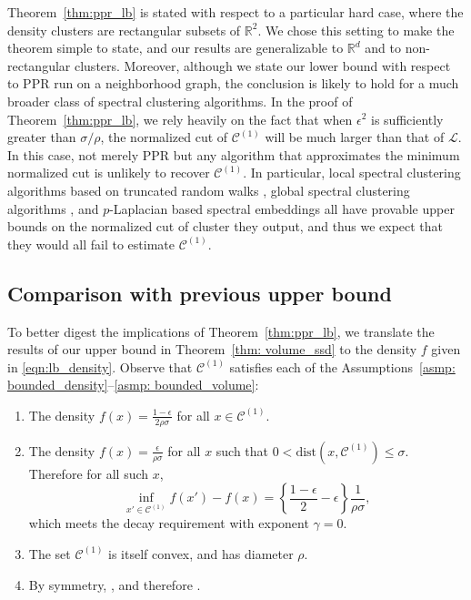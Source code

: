 \documentclass[11pt,twoside]{article}
\theoremstyle{definition}
\newcommand{\vol}{\mathrm{vol}}
\newcommand{\Reals}{\mathbb{R}}
\newcommand{\1}{\mathbbm{1}}
\newcommand{\dist}{\mathrm{dist}}
\newcommand{\Pbb}{\mathbb{P}}
\newcommand{\Cset}{\mathcal{C}}
\begin{document}
Theorem~\ref{thm:ppr_lb} is stated with respect to a particular hard case, where
the density clusters are rectangular subsets of $\Reals^2$.  We chose this
setting to make the theorem simple to state, and our results are generalizable
to $\Reals^d$ and to non-rectangular clusters.  Moreover, although we state
our lower bound with respect to PPR run on a neighborhood graph, the conclusion is
likely to hold for a much broader class of spectral clustering algorithms. In
the proof of Theorem~\ref{thm:ppr_lb}, we rely heavily on the fact that when
$\epsilon^2$ is sufficiently greater than $\sigma/\rho$, the normalized cut of
$\Cset^{(1)}$ will be much larger than that of $\mathcal{L}$. In this case, not
merely PPR but any algorithm that approximates the minimum normalized cut is
unlikely to recover $\Cset^{(1)}$. In particular, local spectral clustering
algorithms based on truncated random walks \citet{spielman2013}, global spectral
clustering algorithms \citet{shi00}, and $p$-Laplacian based spectral embeddings
\citet{hein2010} all have provable upper bounds on the normalized cut of cluster
they output, and thus we expect that they would all fail to estimate
$\Cset^{(1)}$.

\subsection{Comparison with previous upper bound}

To better digest the implications of Theorem~\ref{thm:ppr_lb}, we translate the
results of our upper bound in Theorem~\ref{thm: volume_ssd} to the density $f$
given in \eqref{eqn:lb_density}. Observe that $\Cset^{(1)}$ satisfies each of
the Assumptions~\ref{asmp: bounded_density}--\ref{asmp: bounded_volume}:

\begin{enumerate}[label=(A\arabic*)]
\item The density $f(x) = \frac{1 - \epsilon}{2 \rho \sigma}$ for all $x \in
  \Cset^{(1)}$.  
\item The density $f(x) = \frac{\epsilon}{\rho\sigma}$ for all $x$ such
  that $0 < \dist(x,\Cset^{(1)}) \leq \sigma$. Therefore for all such $x$, 
  $$
  \inf_{x' \in \Cset^{(1)}} f(x') - f(x)  = \left\{\frac{1 - \epsilon}{2} -
    \epsilon \right\} \frac{1}{\rho \sigma},
  $$
  which meets the decay requirement with exponent $\gamma=0$. 
\item The set $\Cset^{(1)}$ is itself convex, and has diameter $\rho$.
\item By symmetry, \smash{$\vol_{\Pbb,r}(\Cset^{(1)}) =
    \vol_{\Pbb,r}(\Cset^{(2)})$}, and therefore
  \smash{$\vol_{\Pbb,r}(\Cset^{(1)}) \leq \frac{1}{2}\vol_{\Pbb,r}(\Reals^d)$}.   
\end{enumerate}
\end{document}
